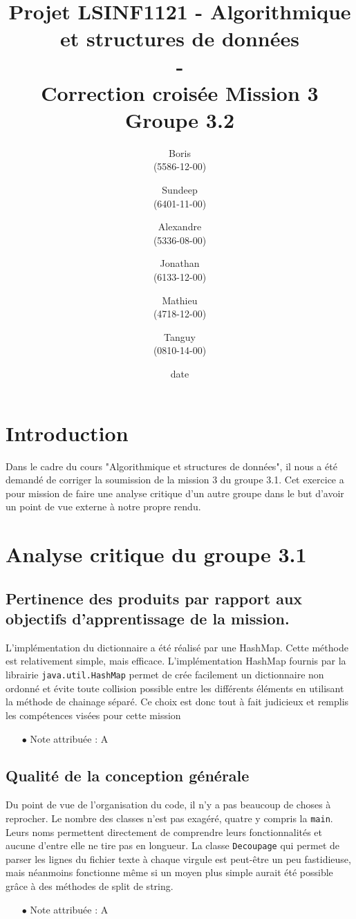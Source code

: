 \documentclass[11pt]{article}
\title{\textbf{Projet LSINF1121 -  Algorithmique et structures de données\\ - \\ Correction croisée Mission 3} \\ {\large Groupe 3.2}}
\author{Boris \bsc{Dehem} \\(5586-12-00)\and Sundeep \bsc{Dhillon} \\(6401-11-00)\and Alexandre \bsc{Hauet} \\ (5336-08-00) \and Jonathan \bsc{Powell}\\(6133-12-00)\and Mathieu \bsc{Rosar} \\ (4718-12-00)\and Tanguy \bsc{Vaessen} \\ (0810-14-00)}
\date{date}
\date{\vspace*{25mm}
\texttt{[image: logo.jpg]}\\
		\vspace*{30mm}
		\begin{center}
		Année académique 2014-2015 \\	
		\end{center}}
\begin{document}
\thispagestyle{empty}

\maketitle
\thispagestyle{empty}
\section{Introduction}
Dans le cadre du cours "Algorithmique et structures de données", il nous a été demandé de corriger la soumission de la mission 3 du groupe 3.1. Cet exercice a pour mission de faire une analyse critique d'un autre groupe dans le but d'avoir un point de vue externe à notre propre rendu. 

\section{Analyse critique du groupe 3.1}

\subsection{Pertinence des produits par rapport aux objectifs d’apprentissage de la mission.}

L'implémentation du dictionnaire a été réalisé par une HashMap. Cette méthode est relativement simple, mais efficace. L'implémentation HashMap fournis par la librairie \verb+java.util.HashMap+ permet de crée facilement un dictionnaire non ordonné et évite toute collision possible entre les différents éléments en utilisant la méthode de chainage séparé. Ce choix est donc tout à fait judicieux et remplis les compétences visées pour cette mission
\\
\begin{itemize}
\item[$\bullet$] Note attribuée : A
\end{itemize}

\subsection{Qualité de la conception générale}

Du point de vue de l'organisation du code, il n'y a pas beaucoup de choses à reprocher. Le nombre des classes n'est pas exagéré, quatre y compris la \verb+main+. Leurs noms permettent directement de comprendre leurs fonctionnalités et aucune d'entre elle ne tire pas en longueur. La classe \verb+Decoupage+ qui permet de parser les lignes du fichier texte à chaque virgule est peut-être un peu fastidieuse, mais néanmoins fonctionne même si un moyen plus simple aurait été possible grâce à des méthodes de split de string.
\\
\begin{itemize}
\item[$\bullet$] Note attribuée : A
\end{itemize}
\end{document}
